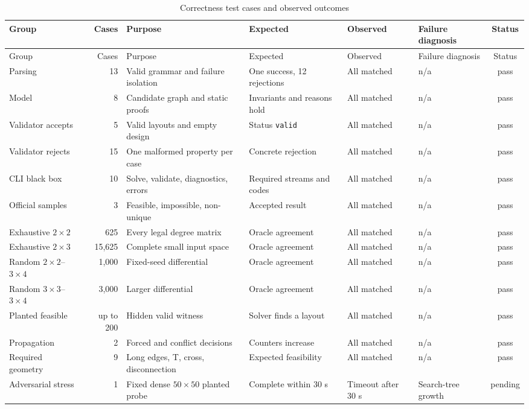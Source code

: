 \documentclass[11pt,a4paper,oneside]{article}
\begin{document}
\begin{scriptsize}
\setlength{\tabcolsep}{3pt}
\begin{longtable}{>{\raggedright\arraybackslash}p{2.2cm}r>{\raggedright\arraybackslash}p{3.0cm}>{\raggedright\arraybackslash}p{2.6cm}>{\raggedright\arraybackslash}p{2.6cm}>{\raggedright\arraybackslash}p{1.8cm}c}
\caption{Correctness test cases and observed outcomes}\\
\toprule
Group & Cases & Purpose & Expected & Observed & Failure diagnosis & Status \\
\midrule
\endfirsthead
\toprule
Group & Cases & Purpose & Expected & Observed & Failure diagnosis & Status \\
\midrule
\endhead
Parsing & 13 & Valid grammar and failure isolation & One success, 12 rejections & All matched & n/a & pass \\
Model & 8 & Candidate graph and static proofs & Invariants and reasons hold & All matched & n/a & pass \\
Validator accepts & 5 & Valid layouts and empty design & Status \texttt{valid} & All matched & n/a & pass \\
Validator rejects & 15 & One malformed property per case & Concrete rejection & All matched & n/a & pass \\
CLI black box & 10 & Solve, validate, diagnostics, errors & Required streams and codes & All matched & n/a & pass \\
Official samples & 3 & Feasible, impossible, non-unique & Accepted result & All matched & n/a & pass \\
Exhaustive $2\times2$ & 625 & Every legal degree matrix & Oracle agreement & All matched & n/a & pass \\
Exhaustive $2\times3$ & 15,625 & Complete small input space & Oracle agreement & All matched & n/a & pass \\
Random $2\times2$--$3\times4$ & 1,000 & Fixed-seed differential & Oracle agreement & All matched & n/a & pass \\
Random $3\times3$--$3\times4$ & 3,000 & Larger differential & Oracle agreement & All matched & n/a & pass \\
Planted feasible & up to 200 & Hidden valid witness & Solver finds a layout & All matched & n/a & pass \\
Propagation & 2 & Forced and conflict decisions & Counters increase & All matched & n/a & pass \\
Required geometry & 9 & Long edges, T, cross, disconnection & Expected feasibility & All matched & n/a & pass \\
Adversarial stress & 1 & Fixed dense $50\times50$ planted probe & Complete within 30 s & Timeout after 30 s & Search-tree growth & pending \\
\bottomrule
\end{longtable}
\end{scriptsize}
\end{document}
